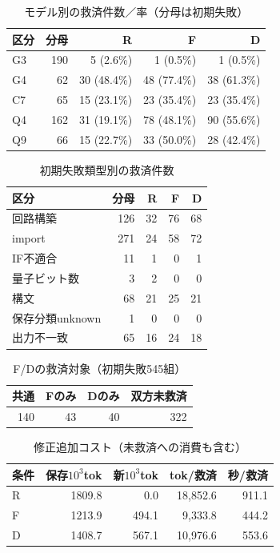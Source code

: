 \begin{table}[tb]
\centering
\caption{モデル別の救済件数／率（分母は初期失敗）}
\label{tab:model}
\begin{tabular}{lrrrr}
\hline
区分 & 分母 & R & F & D \\
\hline
G3 & 190 & 5 (2.6\%) & 1 (0.5\%) & 1 (0.5\%) \\
G4 & 62 & 30 (48.4\%) & 48 (77.4\%) & 38 (61.3\%) \\
C7 & 65 & 15 (23.1\%) & 23 (35.4\%) & 23 (35.4\%) \\
Q4 & 162 & 31 (19.1\%) & 78 (48.1\%) & 90 (55.6\%) \\
Q9 & 66 & 15 (22.7\%) & 33 (50.0\%) & 28 (42.4\%) \\
\hline
\end{tabular}
\end{table}

\begin{table}[tb]
\centering
\caption{初期失敗類型別の救済件数}
\label{tab:error}
\begin{tabular}{lrrrr}
\hline
区分 & 分母 & R & F & D \\
\hline
回路構築 & 126 & 32 & 76 & 68 \\
import & 271 & 24 & 58 & 72 \\
IF不適合 & 11 & 1 & 0 & 1 \\
量子ビット数 & 3 & 2 & 0 & 0 \\
構文 & 68 & 21 & 25 & 21 \\
保存分類unknown & 1 & 0 & 0 & 0 \\
出力不一致 & 65 & 16 & 24 & 18 \\
\hline
\end{tabular}
\end{table}

\begin{table}[tb]
\centering
\caption{F/Dの救済対象（初期失敗545組）}
\label{tab:overlap}
\begin{tabular}{rrrr}
\hline
共通 & Fのみ & Dのみ & 双方未救済 \\
\hline
140 & 43 & 40 & 322 \\
\hline
\end{tabular}
\end{table}

\begin{table}[tb]
\centering
\caption{修正追加コスト（未救済への消費も含む）}
\label{tab:cost}
\begin{tabular}{lrrrr}
\hline
条件 & 保存$10^3$tok & 新$10^3$tok & tok/救済 & 秒/救済 \\
\hline
R & 1809.8 & 0.0 & 18,852.6 & 911.1 \\
F & 1213.9 & 494.1 & 9,333.8 & 444.2 \\
D & 1408.7 & 567.1 & 10,976.6 & 553.6 \\
\hline
\end{tabular}
\end{table}

